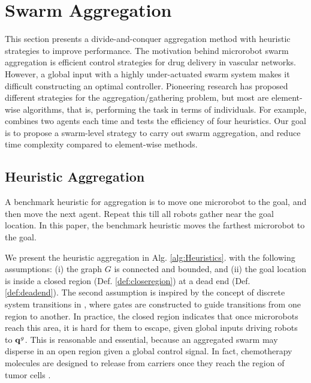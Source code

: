 \section{Swarm Aggregation}\label{sec:agg}
This section presents a divide-and-conquer aggregation method with heuristic strategies to improve performance. 
The motivation behind microrobot swarm aggregation is efficient control strategies for drug delivery in vascular networks. However, a global input with a highly under-actuated swarm system makes it difficult constructing an optimal controller. Pioneering research has proposed different strategies for the aggregation/gathering problem, but most are element-wise algorithms, that is, performing the task in terms of individuals. For example, \cite{mahadev2016collecting} combines two agents each time and tests the efficiency of four heuristics. Our goal is to propose a swarm-level strategy to carry out swarm aggregation, and reduce time complexity compared to element-wise methods.


\subsection{Heuristic Aggregation}
A benchmark heuristic for aggregation is to move one microrobot to the goal, and then move the next agent. 
Repeat this till all robots gather near the goal location. 
In this paper, the benchmark heuristic moves the farthest microrobot to the goal.

We present the heuristic aggregation in Alg. \ref{alg:Heuristics}.
with the following assumptions: (i) the graph $G$ is connected and bounded, and (ii) the goal location is inside a closed region (Def. \ref{def:closeregion}) at a dead end (Def. \ref{def:deadend}).
 The second assumption is inspired by the concept of discrete system transitions in \cite{bobadilla2011controlling}, where gates are constructed to guide transitions from one region to another. 
  In practice, the closed region indicates that once microrobots reach this area, it is hard for them to escape, given global inputs driving robots to ${\bf q}^g$. 
  This is reasonable and essential, because an aggregated swarm may disperse in an open region given a global control signal. In fact, chemotherapy molecules are designed to release from carriers once they reach the region of tumor cells \cite{tiwari2012drug}.    

